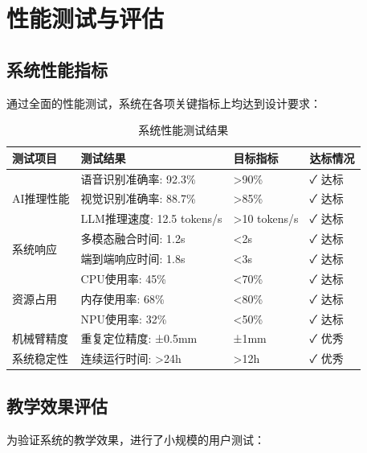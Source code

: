 \documentclass[12pt,a4paper]{article}
\begin{document}
\newpage

\section{性能测试与评估}

\subsection{系统性能指标}

通过全面的性能测试，系统在各项关键指标上均达到设计要求：

\begin{table}[H]
    \centering
    \caption{系统性能测试结果}
    \begin{tabular}{|l|l|l|l|}
        \hline
        \textbf{测试项目} & \textbf{测试结果} & \textbf{目标指标} & \textbf{达标情况} \\
        \hline
        \multirow{3}{*}{AI推理性能} & 语音识别准确率: 92.3\% & >90\% & ✓ 达标 \\
        \cline{2-4}
        & 视觉识别准确率: 88.7\% & >85\% & ✓ 达标 \\
        \cline{2-4}
        & LLM推理速度: 12.5 tokens/s & >10 tokens/s & ✓ 达标 \\
        \hline
        \multirow{2}{*}{系统响应} & 多模态融合时间: 1.2s & <2s & ✓ 达标 \\
        \cline{2-4}
        & 端到端响应时间: 1.8s & <3s & ✓ 达标 \\
        \hline
        \multirow{3}{*}{资源占用} & CPU使用率: 45\% & <70\% & ✓ 达标 \\
        \cline{2-4}
        & 内存使用率: 68\% & <80\% & ✓ 达标 \\
        \cline{2-4}
        & NPU使用率: 32\% & <50\% & ✓ 达标 \\
        \hline
        机械臂精度 & 重复定位精度: ±0.5mm & ±1mm & ✓ 优秀 \\
        \hline
        系统稳定性 & 连续运行时间: >24h & >12h & ✓ 优秀 \\
        \hline
    \end{tabular}
    \label{tab:performance}
\end{table}

\subsection{教学效果评估}

为验证系统的教学效果，进行了小规模的用户测试：
\end{document}
